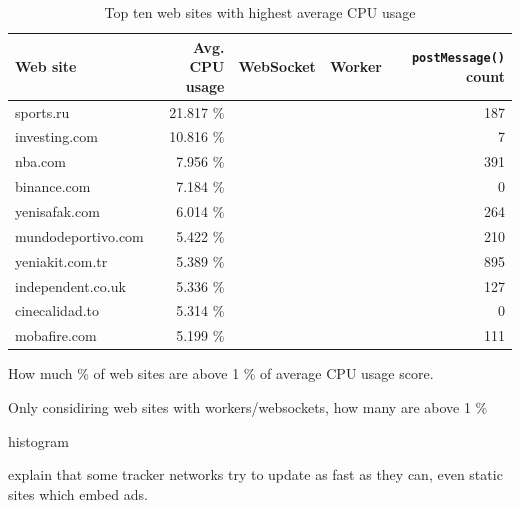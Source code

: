 \documentclass[
	ngerman,
	ruledheaders=section,%
	class=report,%
	thesis={type=bachelor},%
	accentcolor=9c,%
	custommargins=true,%
	marginpar=false,%
	parskip=half-,%
	fontsize=11pt,%
]{tudapub}
\newcommand*{\FeatureTrue}{\ding{52}}
\newcommand*{\FeatureFalse}{\ding{56}}
\begin{document}
  \begin{table}
    \begin{adjustbox}{center}
      \begin{tabular}{l | r | c | c | r}
        Web site           & Avg. CPU usage & WebSocket     & Worker        & \texttt{postMessage()} count \\
        \hline
        sports.ru          & 21.817 \%      & \FeatureTrue  & \FeatureFalse & 187                          \\
        investing.com      & 10.816 \%      & \FeatureTrue  & \FeatureFalse & 7                            \\
        nba.com            & 7.956 \%       & \FeatureFalse & \FeatureTrue  & 391                          \\
        binance.com        & 7.184 \%       & \FeatureTrue  & \FeatureFalse & 0                            \\
        yenisafak.com      & 6.014 \%       & \FeatureTrue  & \FeatureTrue  & 264                          \\
        mundodeportivo.com & 5.422 \%       & \FeatureFalse & \FeatureFalse & 210                          \\
        yeniakit.com.tr    & 5.389 \%       & \FeatureTrue  & \FeatureTrue  & 895                          \\
        independent.co.uk  & 5.336 \%       & \FeatureFalse & \FeatureTrue  & 127                          \\
        cinecalidad.to     & 5.314 \%       & \FeatureTrue  & \FeatureTrue  & 0                            \\
        mobafire.com       & 5.199 \%       & \FeatureFalse & \FeatureFalse & 111                          \\
      \end{tabular}
    \end{adjustbox}
    \caption{Top ten web sites with highest average CPU usage}
    \label{tab:cpu-usage-distribution}
  \end{table}

  How much \% of web sites are above 1 \% of average CPU usage score.

  Only considiring web sites with workers/websockets, how many are above 1 \%

  histogram

  explain that some tracker networks try to update as fast as they can, even static sites which embed ads.
\end{document}
